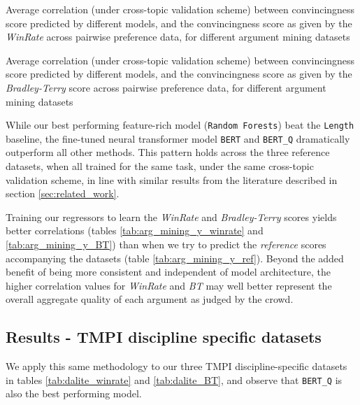 \documentclass[notitlepage,12pt]{jedm}
\begin{document}
\begin{table}
	\caption{
	Average correlation (under cross-topic validation scheme) between 
	convincingness score predicted by different models, and the 
	convincingness score as given by the \textit{WinRate} across pairwise 
	preference data, for different argument mining datasets
}
\label{tab:arg_mining_y_winrate}
	\parbox{.45\linewidth}{
		
	}
	\hfill
	\parbox{.45\linewidth}{
		
	}
\end{table}


\begin{table}
	\caption{
	Average correlation (under cross-topic validation scheme) between 
	convincingness score predicted by different models, and the 
	convincingness score as given by the \textit{Bradley-Terry} score 
	across pairwise preference data, for different argument mining datasets
	}
	\label{tab:arg_mining_y_BT}
	\parbox{.45\linewidth}{
		\centering
		
	}
	\hfill
	\parbox{.45\linewidth}{
		\centering
		
	}
\end{table}

While our best performing feature-rich model (\verb|Random Forests|) beat the 
\verb|Length| baseline, the fine-tuned neural transformer model \verb|BERT| and 
\verb|BERT_Q| dramatically outperform all other methods.
This pattern holds across the three reference datasets, when all trained for 
the same task, under the same cross-topic validation scheme, in line with 
similar results from the literature described in section \ref{sec:related_work}.

Training our regressors to learn the \textit{WinRate}  and 
\textit{Bradley-Terry} scores yields better correlations (tables 
\ref{tab:arg_mining_y_winrate} and \ref{tab:arg_mining_y_BT}) than when we 
try to predict the \textit{reference} scores accompanying the datasets (table 
\ref{tab:arg_mining_y_ref}).
Beyond the added benefit of being more consistent and independent of model 
architecture, the higher correlation values for \textit{WinRate} and 
\textit{BT} may well better represent the overall aggregate quality of each 
argument as judged by the crowd.

\subsection{Results - TMPI discipline specific datasets}
We apply this same methodology to our three TMPI discipline-specific datasets 
in tables \ref{tab:dalite_winrate} and \ref{tab:dalite_BT}, and observe that 
\verb|BERT_Q| is also the best performing model.
\end{document}
